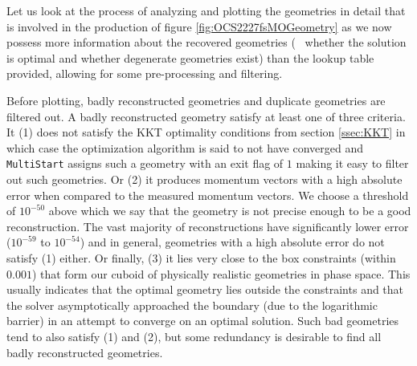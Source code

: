 Let us look at the process of analyzing and plotting the geometries in detail that is involved in the production of figure \ref{fig:OCS2227fsMOGeometry} as we now possess more information about the recovered geometries (\eg~ whether the solution is optimal and whether degenerate geometries exist) than the lookup table provided, allowing for some pre-processing and filtering.

Before plotting, badly reconstructed geometries and duplicate geometries are filtered out. A badly reconstructed geometry satisfy at least one of three criteria. It (1) does not satisfy the KKT optimality conditions from section \ref{ssec:KKT} in which case the optimization algorithm is said to not have converged and \texttt{MultiStart} assigns such a geometry with an exit flag of $1$ making it easy to filter out such geometries. Or (2) it produces momentum vectors with a high absolute error when compared to the measured momentum vectors. We choose a threshold of $10^{-50}$ above which we say that the geometry is not precise enough to be a good reconstruction. The vast majority of reconstructions have significantly lower error ($10^{-59}$ to $10^{-54}$) and in general, geometries with a high absolute error do not satisfy (1) either. Or finally, (3) it lies very close to the box constraints (within $0.001$) that form our cuboid of physically realistic geometries in phase space. This usually indicates that the optimal geometry lies outside the constraints and that the solver asymptotically approached the boundary (due to the logarithmic barrier) in an attempt to converge on an optimal solution. Such bad geometries tend to also satisfy (1) and (2), but some redundancy is desirable to find all badly reconstructed geometries.


